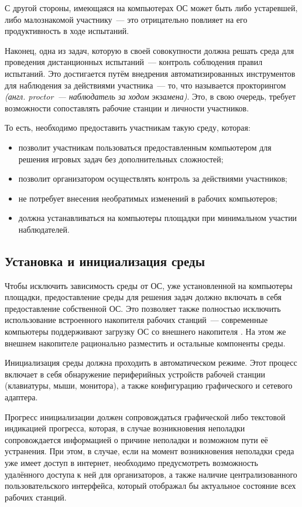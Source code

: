 С другой стороны, имеющаяся на компьютерах ОС может быть либо устаревшей, либо малознакомой участнику~--- это отрицательно повлияет на его продуктивность в ходе испытаний.

Наконец, одна из задач, которую в своей совокупности должна решать среда для проведения дистанционных испытаний~--- контроль соблюдения правил испытаний. Это достигается путём внедрения автоматизированных инструментов для наблюдения за действиями участника~--- то, что называется прокторингом \textit{(англ. proctor~--- наблюдатель за ходом экзамена)}. Это, в свою очередь, требует возможности сопоставлять рабочие станции и личности участников.


То есть, необходимо предоставить участникам такую среду, которая:
\begin{itemize}
\item
  позволит участникам пользоваться предоставленным компьютером для решения игровых задач без дополнительных сложностей;
\item
  позволит организатором осуществлять контроль за действиями участников;
\item
  не потребует внесения необратимых изменений в рабочих компьютеров;
\item
  должна устанавливаться на компьютеры площадки при минимальном участии наблюдателей.
\end{itemize}


\subsection{Установка и инициализация среды}

Чтобы исключить зависимость среды от ОС, уже установленной на компьютеры площадки,  предоставление среды для решения задач должно включать в себя предоставление собственной ОС. Это позволяет также полностью исключить использование встроенного накопителя рабочих станций~--- современные компьютеры поддерживают загрузку ОС со внешнего накопителя \cite{USBBoot}. На этом же внешнем накопителе рационально разместить и остальные компоненты среды.

Инициализация среды должна проходить в автоматическом режиме. Этот процесс включает в себя обнаружение периферийных устройств рабочей станции (клавиатуры, мыши, монитора), а также конфигурацию графического и сетевого адаптера.

Прогресс инициализации должен сопровождаться графической либо текстовой индикацией прогресса, которая, в случае возникновения неполадки сопровождается информацией о причине неполадки и возможном пути её устранения. При этом, в случае, если на момент возникновения неполадки среда уже имеет доступ в интернет, необходимо предусмотреть возможность удалённого доступа к ней для организаторов, а также наличие централизованного пользовательского интерфейса, который отображал бы актуальное состояние всех рабочих станций.

